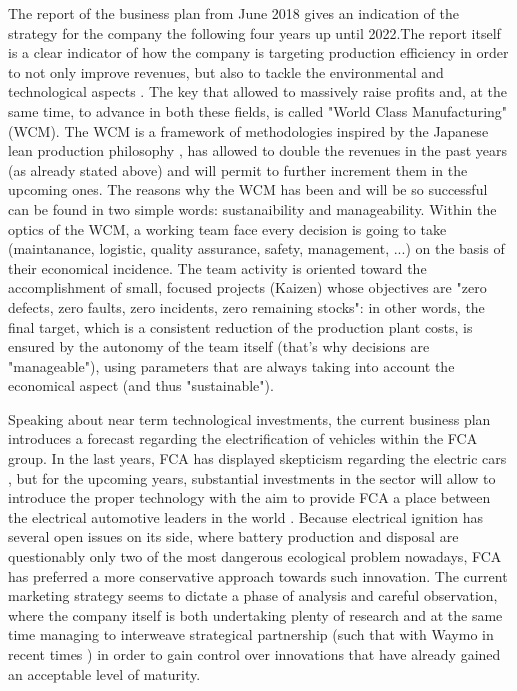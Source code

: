 The report of the business plan from June 2018 gives an indication of the strategy for the company the following four years up until 2022.The report itself is a clear indicator of how the company is targeting production efficiency in order to not only improve revenues, but also to tackle the environmental and technological aspects \cite{fca_financial_overview}. The key that allowed to massively raise profits and, at the same time, to advance in both these fields, is called "World Class Manufacturing" (WCM). The WCM is a framework of methodologies inspired by the Japanese lean production philosophy \cite{fca_wcm}, has allowed  to double the revenues in the past years (as already stated above) and will permit to further increment them in the upcoming ones. 
The reasons why the WCM has been and will be so successful can be found in two simple words: sustanaibility and manageability. Within the optics of the WCM, a working team face every decision is going to take (maintanance, logistic, quality assurance, safety, management, ...) on the basis of their economical incidence. The team activity is oriented toward the accomplishment of small, focused projects (Kaizen) whose objectives are "zero defects, zero faults, zero incidents, zero remaining stocks": in other words, the final target, which is a consistent reduction of the production plant costs, is ensured by the autonomy of the team itself (that's why decisions are "manageable"), using parameters that are always taking into account the economical aspect (and thus "sustainable").

Speaking about near term technological investments, the current business plan introduces a forecast regarding the electrification of vehicles within the FCA group. In the last years, FCA has displayed skepticism regarding the electric cars \cite{fca_electric_bet}, but for the upcoming years, substantial investments in the sector will allow to introduce the proper technology with the aim to provide FCA a place between the electrical automotive leaders in the world \cite{fca_financial_overview}. Because electrical ignition has several open issues on its side, where battery production and disposal are questionably only two of the most dangerous ecological problem nowadays, FCA has preferred a more conservative approach towards such innovation. The current marketing strategy \cite{fca_financial_overview} seems to dictate a phase of analysis and careful observation, where the company itself is both undertaking plenty of research and at the same time managing to interweave strategical partnership (such that with Waymo in recent times \cite{fca_waymo_partnership}) in order to gain control over innovations that have already gained an acceptable level of maturity.

